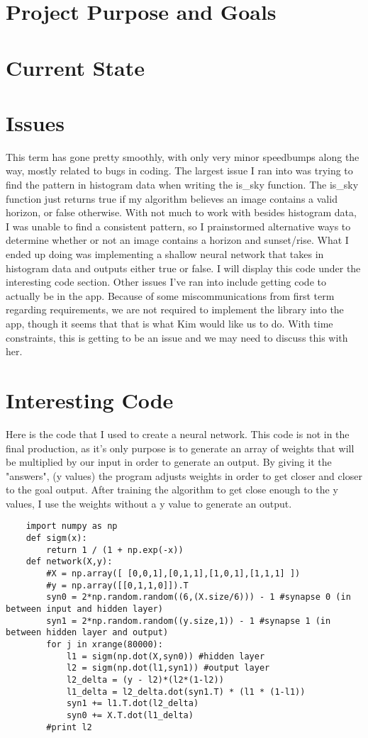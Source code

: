 \documentclass[onecolumn, draftclsnofoot,10pt, compsoc]{IEEEtran}
\begin{document}
\begin{singlespace}

	\section{Project Purpose and Goals}
	
		
	\section{Current State}


	\section{Issues}
	This term has gone pretty smoothly, with only very minor speedbumps along the way, mostly related to bugs in coding.
	The largest issue I ran into was trying to find the pattern in histogram data when writing the is_sky function.
	The is_sky function just returns true if my algorithm believes an image contains a valid horizon, or false otherwise.
	With not much to work with besides histogram data, I was unable to find a consistent pattern, so I prainstormed alternative ways to determine whether or not an image contains a horizon and sunset/rise.
	What I ended up doing was implementing a shallow neural network that takes in histogram data and outputs either true or false.
	I will display this code under the interesting code section.
	Other issues I've ran into include getting code to actually be in the app.
	Because of some miscommunications from first term regarding requirements, we are not required to implement the library into the app, though it seems that that is what Kim would like us to do.
	With time constraints, this is getting to be an issue and we may need to discuss this with her.
	\section{Interesting Code}
	Here is the code that I used to create a neural network.
	This code is not in the final production, as it's only purpose is to generate an array of weights that will be multiplied by our input in order to generate an output.
	By giving it the "answers", (y values) the program adjusts weights in order to get closer and closer to the goal output. 
	After training the algorithm to get close enough to the y values, I use the weights without a y value to generate an output.
	\begin{lstlisting}
	import numpy as np
	def sigm(x):
		return 1 / (1 + np.exp(-x))
	def network(X,y):	
		#X = np.array([ [0,0,1],[0,1,1],[1,0,1],[1,1,1] ])
		#y = np.array([[0,1,1,0]]).T
		syn0 = 2*np.random.random((6,(X.size/6))) - 1 #synapse 0 (in between input and hidden layer)	
		syn1 = 2*np.random.random((y.size,1)) - 1 #synapse 1 (in between hidden layer and output)
		for j in xrange(80000):
			l1 = sigm(np.dot(X,syn0)) #hidden layer
			l2 = sigm(np.dot(l1,syn1)) #output layer
			l2_delta = (y - l2)*(l2*(1-l2))
			l1_delta = l2_delta.dot(syn1.T) * (l1 * (1-l1))
			syn1 += l1.T.dot(l2_delta)
			syn0 += X.T.dot(l1_delta)
		#print l2
		


\end{lstlisting}
\end{singlespace}
\end{document}
